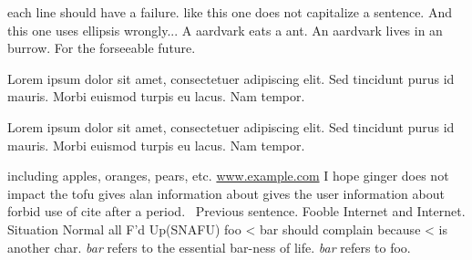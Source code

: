 each line should have a failure.  like this one does not capitalize a sentence.
And this one uses ellipsis wrongly...
A aardvark eats a ant.
An aardvark lives in an burrow.
For the forseeable future.
\caption{Lorem ipsum dolor sit amet, consectetuer adipiscing elit. Sed tincidunt purus id mauris. Morbi euismod turpis eu lacus. Nam tempor.}
\caption{\label{thelabel}Lorem ipsum dolor sit amet, consectetuer adipiscing elit. Sed tincidunt purus id mauris. Morbi euismod turpis eu lacus. Nam tempor.}
including apples, oranges, pears, etc.
\url{www.example.com}
I hope ginger does not impact the tofu
gives alan information about
gives the user information about
forbid use of cite after a period.~\cite{foo}
Previous sentence.  Fooble Internet and Internet.
Situation Normal all F'd Up(SNAFU)
foo < bar should complain because < is another char.
\emph{bar} refers to the essential bar-ness of life.
\emph{bar} refers to foo.
